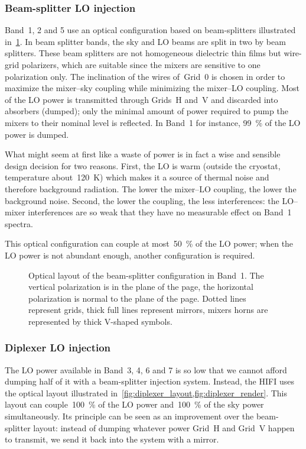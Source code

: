 \subsubsection{Beam-splitter LO injection}
Band~1, 2 and 5 use an optical configuration based on beam-splitters illustrated in~\cref{fig:beamsplitter_layout}.
In beam splitter bands, the sky and LO beams are split in two by beam splitters.
These beam splitters are not homogeneous dielectric thin films but wire-grid polarizers, which are suitable since the mixers are sensitive to one polarization only.
The inclination of the wires of~Grid~0 is chosen in order to maximize the mixer--sky coupling while minimizing the mixer--LO coupling.
Most of the LO power is transmitted through Grids~H and~V and discarded into absorbers (dumped);
only the minimal amount of power required to pump the mixers to their nominal level is reflected.
In Band~1 for instance, \SI{99}{\percent} of the LO power is dumped.

What might seem at first like a waste of power is in fact a wise and sensible design decision for two reasons.
First, the LO is warm (outside the cryostat, temperature about~\SI{120}{\kelvin}) which makes it a source of thermal noise and therefore background radiation.
The lower the mixer--LO coupling, the lower the background noise.
Second, the lower the coupling, the less interferences: the LO--mixer interferences are so weak that they have no measurable effect on Band~1 spectra.

This optical configuration can couple at most~\SI{50}{\percent} of the LO power;
when the LO power is not abundant enough, another configuration is required.

\begin{figure}
    \centering
    \footnotesize
    
    \caption{Optical layout of the beam-splitter configuration in Band~1.
    The vertical polarization is in the plane of the page, the horizontal polarization is normal to the plane of the page.
    Dotted lines represent grids, thick full lines represent mirrors, mixers horns are represented by thick V-shaped symbols.
    }
    \label{fig:beamsplitter_layout}
\end{figure}

\subsubsection{Diplexer LO injection}
\label{sec:diplexer_lo_injection}
The LO power available in Band~3, 4, 6 and 7 is so low that we cannot afford dumping half of it with a beam-splitter injection system.
Instead, the HIFI uses the optical layout illustrated in~\cref{fig:diplexer_layout,fig:diplexer_render}.
This layout can couple~\SI{100}{\percent} of the LO power and~\SI{100}{\percent} of the sky power simultaneously.
Its principle can be seen as an improvement over the beam-splitter layout:
instead of dumping whatever power Grid~H and Grid~V happen to transmit, we send it back into the system with a mirror.

